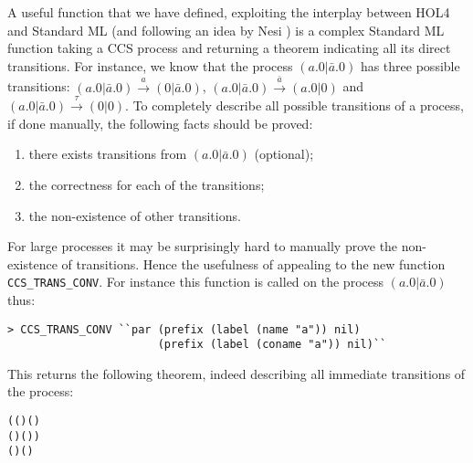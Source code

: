 A useful function that we have defined, exploiting the interplay
between HOL4 and Standard ML (and following an idea by Nesi \cite{Nesi:1992ve})
 is a complex Standard ML function
  taking a CCS process and returning a theorem indicating all its direct transitions.
For instance, we know that the process $(a.0 | \bar{a}.0)$ has three
possible transitions: $(a.0 | \bar{a}.0) \overset{a}{\longrightarrow}
(0 | \bar{a}.0)$, $(a.0 | \bar{a}.0)
\overset{\bar{a}}{\longrightarrow} (a.0 | 0)$ and $(a.0 | \bar{a}.0)
\overset{\tau}{\longrightarrow} (0 | 0)$.
To completely describe all possible transitions of a process, if done manually, the
following facts should be proved:
\begin{enumerate}
\iflong
\item there exists transitions from $(a.0 | \bar{a}.0)$ (optional);
\fi
\item the correctness for each of the transitions;
\item the non-existence of other transitions.
\end{enumerate}
For large processes it may be surprisingly hard to manually prove the
non-existence of transitions.  Hence the usefulness of appealing to 
the new  function \texttt{CCS\_TRANS\_CONV}. 
For instance this function
is called on the  process $(a.0 | \bar{a}.0)$ thus:
\begin{lstlisting}
> CCS_TRANS_CONV ``par (prefix (label (name "a")) nil)
                       (prefix (label (coname "a")) nil)``
\end{lstlisting}
This returns the following theorem, indeed describing all immediate
transitions of the process:
\begin{alltt}
\HOLTokenTurnstile{}   \HOLSymConst{\ensuremath{\parallel}}   \HOLTokenTransBegin{}\HOLTokenTransEnd {} \HOLSymConst{\HOLTokenEquiv{}}
   (( \HOLSymConst{=}  ) \HOLSymConst{\HOLTokenConj{}} ( \HOLSymConst{=}  \HOLSymConst{\ensuremath{\parallel}}  ) \HOLSymConst{\HOLTokenDisj{}}
    ( \HOLSymConst{=}  ) \HOLSymConst{\HOLTokenConj{}} ( \HOLSymConst{=}   \HOLSymConst{\ensuremath{\parallel}} )) \HOLSymConst{\HOLTokenDisj{}}
   ( \HOLSymConst{=} \HOLSymConst{\ensuremath{\tau}}) \HOLSymConst{\HOLTokenConj{}} ( \HOLSymConst{=}  \HOLSymConst{\ensuremath{\parallel}} )
\end{alltt}
